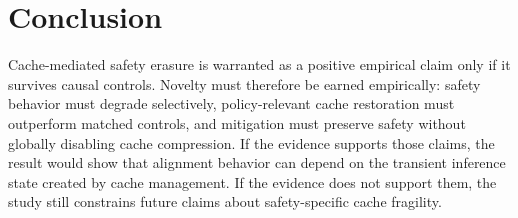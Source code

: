 \documentclass[11pt]{article}
\begin{document}
\section{Conclusion}

Cache-mediated safety erasure is warranted as a positive empirical claim only if it survives causal controls. Novelty must therefore be earned empirically: safety behavior must degrade selectively, policy-relevant cache restoration must outperform matched controls, and mitigation must preserve safety without globally disabling cache compression. If the evidence supports those claims, the result would show that alignment behavior can depend on the transient inference state created by cache management. If the evidence does not support them, the study still constrains future claims about safety-specific cache fragility.



\end{document}
